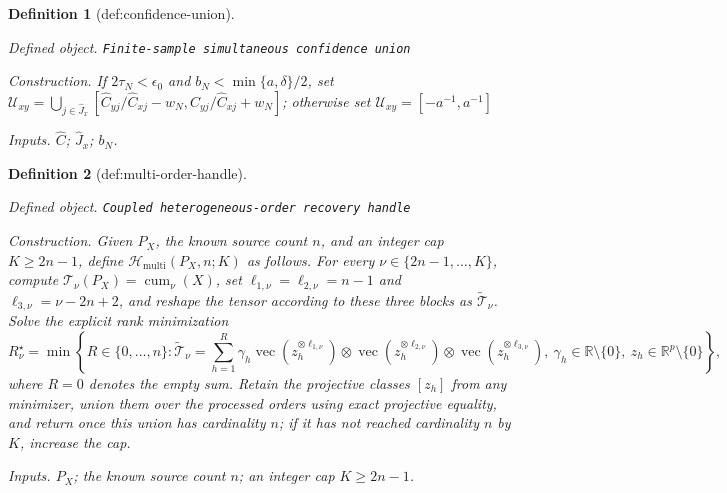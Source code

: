 \documentclass{article}
\newtheorem{definition}{Definition}
\begin{document}
\begin{definition}[def:confidence-union]\label{def:confidence-union}
\par\smallskip\noindent\emph{Defined object.} \texttt{Finite-\allowbreak{}sample simultaneous confidence union}
\par\smallskip\noindent\emph{Construction.} If \(2\tau_N<\epsilon_0\) and \(b_N<\min\{a,\delta\}/2\), set \(\mathcal U_{xy}=\bigcup_{j\in\widehat J_x}[\widehat C_{yj}/\widehat C_{xj}-w_N,\widehat C_{yj}/\widehat C_{xj}+w_N]\); otherwise set \(\mathcal U_{xy}=[-a^{-1},a^{-1}]\)
\par\smallskip\noindent\emph{Inputs.} \(\widehat C\); \(\widehat J_x\); \(b_N\).
\end{definition}

\begin{definition}[def:multi-order-handle]\label{def:multi-order-handle}
\par\smallskip\noindent\emph{Defined object.} \texttt{Coupled heterogeneous-\allowbreak{}order recovery handle}
\par\smallskip\noindent\emph{Construction.} Given \(P_X\), the known source count \(n\), and an integer cap \(K\ge2n-1\), define \(\mathcal H_{\mathrm{multi}}(P_X,n;K)\) as follows. For every \(\nu\in\{2n-1,\ldots,K\}\), compute \(\mathcal T_\nu(P_X)=\operatorname{cum}_\nu(X)\), set \(\ell_{1,\nu}=\ell_{2,\nu}=n-1\) and \(\ell_{3,\nu}=\nu-2n+2\), and reshape the tensor according to these three blocks as \(\widetilde{\mathcal T}_\nu\). Solve the explicit rank minimization
\[
 R_\nu^\star=
 \min\left\{
 R\in\{0,\ldots,n\}:
 \widetilde{\mathcal T}_\nu
 =\sum_{h=1}^{R}\gamma_h
 \operatorname{vec}(z_h^{\otimes\ell_{1,\nu}})\otimes
 \operatorname{vec}(z_h^{\otimes\ell_{2,\nu}})\otimes
 \operatorname{vec}(z_h^{\otimes\ell_{3,\nu}}),\ 
 \gamma_h\in\mathbb R\setminus\{0\},\ 
 z_h\in\mathbb R^p\setminus\{0\}
 \right\},
\]
where \(R=0\) denotes the empty sum. Retain the projective classes \([z_h]\) from any minimizer, union them over the processed orders using exact projective equality, and return once this union has cardinality \(n\); if it has not reached cardinality \(n\) by \(K\), increase the cap.
\par\smallskip\noindent\emph{Inputs.} \(P_X\); the known source count \(n\); an integer cap \(K\ge2n-1\).
\end{definition}
\end{document}
